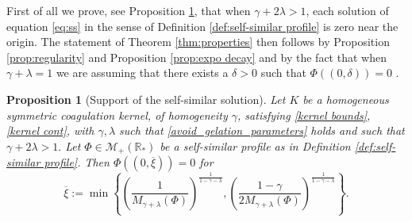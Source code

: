 \documentclass[11pt]{article}
\numberwithin{equation}{section}
\theoremstyle{plain}
\newtheorem{proposition}[theorem]{Proposition}
\begin{document}
First of all we prove, see Proposition \ref{prop:support}, that when $\gamma + 2 \lambda >1$, each solution of equation \eqref{eq:ss} in the sense of Definition \ref{def:self-similar profile} is zero near the origin. 
The statement of Theorem \ref{thm:properties} then follows by Proposition \ref{prop:regularity} and Proposition \ref{prop:expo decay} and by the fact that when $\gamma+\lambda=1 $ we are assuming that there exists a $\delta>0$ such that $\Phi((0, \delta))=0$ .
\begin{proposition}[Support of the self-similar solution]\label{prop:support}
Let $K$ be a homogeneous symmetric coagulation kernel, of homogeneity $\gamma$, satisfying
\eqref{kernel bounds},  \eqref{kernel cont},  with $\gamma , \lambda $ such that  \eqref{avoid_gelation_parameters} holds and such that
$\gamma+2\lambda > 1.$
	Let $\Phi \in \mathcal M_+(\mathbb R_*)$ be a self-similar profile as in Definition \ref{def:self-similar profile}. 
	Then $	\Phi((0, \overline \xi ))=0$ for 
	\[
	\overline \xi := \min\left\{ \left( \frac{1}{M_{\gamma+\lambda}(\Phi)} \right)^{\frac{1}{1-\gamma-\lambda}} , \left( \frac{1-\gamma}{ 2M_{\gamma+\lambda}(\Phi)} \right)^{\frac{1}{1-\gamma-\lambda}} \right\}.
	 \]
\end{proposition}
\end{document}
